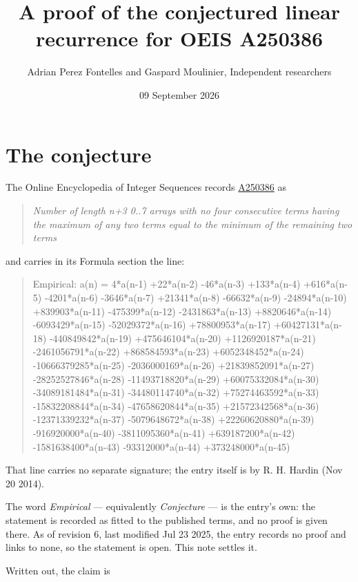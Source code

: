 \documentclass[11pt]{article}
\title{A proof of the conjectured linear recurrence for OEIS A250386}
\author{Adrian Perez Fontelles and Gaspard Moulinier, Independent researchers}
\date{09 September 2026}
\theoremstyle{definition}
\begin{document}
\maketitle
\section{The conjecture}

The Online Encyclopedia of Integer Sequences records \href{https://oeis.org/A250386}{A250386} as

\begin{quote}\itshape Number of length n+3 0..7 arrays with no four consecutive terms having the maximum of any two terms equal to the minimum of the remaining two terms\end{quote}

and carries in its Formula section the line:

\begin{quote}\ttfamily Empirical: a(n) = 4*a(n-1) +22*a(n-2) -46*a(n-3) +133*a(n-4) +616*a(n-5) -4201*a(n-6) -3646*a(n-7) +21341*a(n-8) -66632*a(n-9) -24894*a(n-10) +839903*a(n-11) -475399*a(n-12) -2431863*a(n-13) +8820646*a(n-14) -6093429*a(n-15) -52029372*a(n-16) +78800953*a(n-17) +60427131*a(n-18) -440849842*a(n-19) +475646104*a(n-20) +1126920187*a(n-21) -2461056791*a(n-22) +868584593*a(n-23) +6052348452*a(n-24) -10666379285*a(n-25) -2036000169*a(n-26) +21839852091*a(n-27) -28252527846*a(n-28) -11493718820*a(n-29) +60075332084*a(n-30) -34089181484*a(n-31) -34480114740*a(n-32) +75274463592*a(n-33) -15832208844*a(n-34) -47658620844*a(n-35) +21572342568*a(n-36) -12371339232*a(n-37) -5079648672*a(n-38) +22260620880*a(n-39) -916920000*a(n-40) -3811095360*a(n-41) +639187200*a(n-42) -1581638400*a(n-43) -93312000*a(n-44) +373248000*a(n-45)\end{quote}

That line carries no separate signature; the entry itself is by R. H. Hardin (Nov 20 2014).

The word {\itshape Empirical} --- equivalently {\itshape Conjecture} --- is the entry's own: the statement is recorded as fitted to the published terms, and no proof is given there. As of revision 6, last modified Jul 23 2025, the entry records no proof and links to none, so the statement is open. This note settles it.

Written out, the claim is
\end{document}

